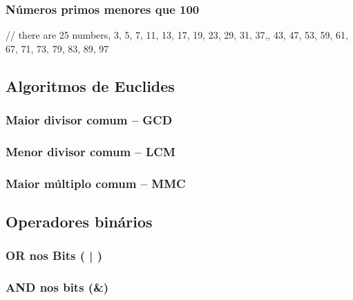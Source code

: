 \documentclass[a4paper,12pt]{article}
\begin{document}

\subsubsection{Números primos menores que 100}

// there are 25 numbers, 3, 5, 7, 11, 13, 17, 19, 23, 29, 31, 37,, 43, 47, 53, 59, 61, 67, 71, 73, 79, 83, 89, 97

\subsection{Algoritmos de Euclides}
\subsubsection{Maior divisor comum – GCD}


\subsubsection{Menor divisor comum – LCM}


\subsubsection{Maior múltiplo comum – MMC}


\subsection{Operadores binários}
\subsubsection{OR nos Bits ( | )}

\subsubsection{AND nos bits (\&)}
\end{document}
